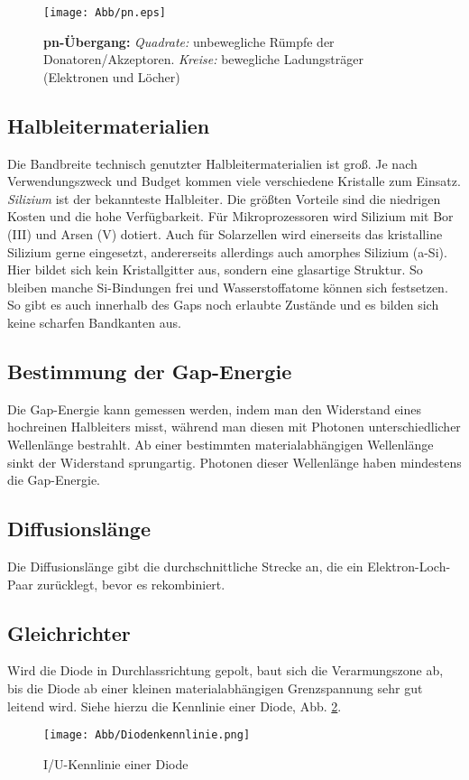 \begin{figure}[htb]
	\centering
	\texttt{[image: Abb/pn.eps]}
	\caption{\textbf{pn-Übergang:} \emph{Quadrate:} unbewegliche Rümpfe der Donatoren/Akzeptoren. \emph{Kreise:} bewegliche Ladungsträger (Elektronen und Löcher)}
	\label{pn}
\end{figure}

\subsection*{Halbleitermaterialien}
Die Bandbreite technisch genutzter Halbleitermaterialien ist groß. Je nach Verwendungszweck und Budget kommen viele verschiedene Kristalle zum Einsatz.\\
\emph{Silizium} ist der bekannteste Halbleiter. Die größten Vorteile sind die niedrigen Kosten und die hohe Verfügbarkeit. Für Mikroprozessoren wird Silizium mit Bor (III) und Arsen (V) dotiert. Auch für Solarzellen wird einerseits das kristalline Silizium gerne eingesetzt, andererseits allerdings auch amorphes Silizium (a-Si). Hier bildet sich kein Kristallgitter aus, sondern eine glasartige Struktur. So bleiben manche Si-Bindungen frei und Wasserstoffatome können sich festsetzen. So gibt es auch innerhalb des Gaps noch erlaubte Zustände und es bilden sich keine scharfen Bandkanten aus. \label{halbmat}

\subsection*{Bestimmung der Gap-Energie}
Die Gap-Energie kann gemessen werden, indem man den Widerstand eines hochreinen Halbleiters misst, während man diesen mit Photonen unterschiedlicher Wellenlänge bestrahlt. Ab einer bestimmten materialabhängigen Wellenlänge sinkt der Widerstand sprungartig. Photonen dieser Wellenlänge haben mindestens die Gap-Energie.

\subsection*{Diffusionslänge}
Die Diffusionslänge gibt die durchschnittliche Strecke an, die ein Elektron-Loch-Paar zurücklegt, bevor es rekombiniert. 

\subsection*{Gleichrichter}
Wird die Diode in Durchlassrichtung gepolt, baut sich die Verarmungszone ab, bis die Diode ab einer kleinen materialabhängigen Grenzspannung sehr gut leitend wird. Siehe hierzu die Kennlinie einer Diode, Abb. \ref{diodekenn}.
\begin{figure}[htb]
	\centering
	\texttt{[image: Abb/Diodenkennlinie.png]}
	\caption{I/U-Kennlinie einer Diode}
	\label{diodekenn}
\end{figure}


